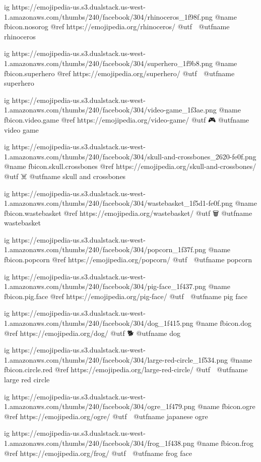   ig https://emojipedia-us.s3.dualstack.us-west-1.amazonaws.com/thumbs/240/facebook/304/rhinoceros_1f98f.png
  @name fbicon.nosorog
  @ref https://emojipedia.org/rhinoceros/
  @utf 🦏
  @utfname rhinoceros

  ig https://emojipedia-us.s3.dualstack.us-west-1.amazonaws.com/thumbs/240/facebook/304/superhero_1f9b8.png
  @name fbicon.superhero
  @ref https://emojipedia.org/superhero/
  @utf 🦸
  @utfname superhero

  ig https://emojipedia-us.s3.dualstack.us-west-1.amazonaws.com/thumbs/240/facebook/304/video-game_1f3ae.png
  @name fbicon.video.game
  @ref https://emojipedia.org/video-game/
  @utf 🎮
  @utfname video game


  ig https://emojipedia-us.s3.dualstack.us-west-1.amazonaws.com/thumbs/240/facebook/304/skull-and-crossbones_2620-fe0f.png
  @name fbicon.skull.crossbones
  @ref https://emojipedia.org/skull-and-crossbones/
  @utf ☠️
  @utfname skull and crossbones

  ig https://emojipedia-us.s3.dualstack.us-west-1.amazonaws.com/thumbs/240/facebook/304/wastebasket_1f5d1-fe0f.png
  @name fbicon.wastebasket
  @ref https://emojipedia.org/wastebasket/
  @utf 🗑
  @utfname wastebasket

  ig https://emojipedia-us.s3.dualstack.us-west-1.amazonaws.com/thumbs/240/facebook/304/popcorn_1f37f.png
  @name fbicon.popcorn
  @ref https://emojipedia.org/popcorn/
  @utf 🍿
  @utfname popcorn

  ig https://emojipedia-us.s3.dualstack.us-west-1.amazonaws.com/thumbs/240/facebook/304/pig-face_1f437.png
  @name fbicon.pig.face
  @ref https://emojipedia.org/pig-face/
  @utf 🐷
  @utfname pig face

  ig https://emojipedia-us.s3.dualstack.us-west-1.amazonaws.com/thumbs/240/facebook/304/dog_1f415.png
  @name fbicon.dog
  @ref https://emojipedia.org/dog/
  @utf 🐕
  @utfname dog

  ig https://emojipedia-us.s3.dualstack.us-west-1.amazonaws.com/thumbs/240/facebook/304/large-red-circle_1f534.png
  @name fbicon.circle.red
  @ref https://emojipedia.org/large-red-circle/
  @utf 🔴
  @utfname large red circle

  ig https://emojipedia-us.s3.dualstack.us-west-1.amazonaws.com/thumbs/240/facebook/304/ogre_1f479.png
  @name fbicon.ogre
  @ref https://emojipedia.org/ogre/
  @utf 👹
  @utfname japanese ogre

  ig https://emojipedia-us.s3.dualstack.us-west-1.amazonaws.com/thumbs/240/facebook/304/frog_1f438.png
  @name fbicon.frog
  @ref https://emojipedia.org/frog/
  @utf 🐸
  @utfname frog face

